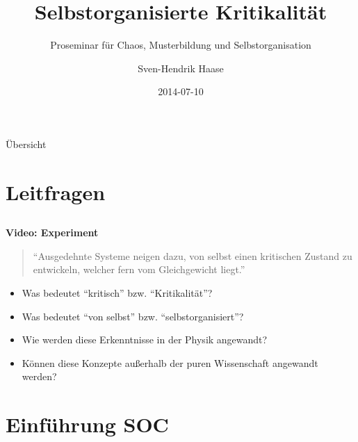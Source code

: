 \documentclass{beamer}
\begin{document}
\title{Selbstorganisierte Kritikalität}
\subtitle{Proseminar für Chaos, Musterbildung und Selbstorganisation}
\date{2014-07-10}
\author{Sven-Hendrik Haase}

\begin{frame}
    \titlepage
\end{frame}

\begin{frame}{Übersicht}
    \tableofcontents
\end{frame}

\section{Leitfragen}
\subsection{}
\begin{frame}{\insertsection}{\insertsubsection}
    \textbf{Video: Experiment}
    \pause
	\begin{quote}
        ``Ausgedehnte Systeme neigen dazu, von selbst einen kritischen Zustand zu entwickeln,
        welcher fern vom Gleichgewicht liegt.''
        \tiny
	\end{quote}
    \pause
    \begin{itemize}
        \item Was bedeutet ``kritisch'' bzw. ``Kritikalität''?
        \pause
        \item Was bedeutet ``von selbst'' bzw. ``selbstorganisiert''?
        \pause
        \item Wie werden diese Erkenntnisse in der Physik angewandt?
        \pause
        \item Können diese Konzepte außerhalb der puren Wissenschaft angewandt werden?
    \end{itemize}
\end{frame}

\section{Einführung SOC}
\end{document}
